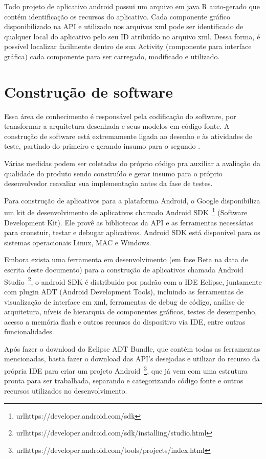 Todo projeto de aplicativo android possui um arquivo em java R auto-gerado que contém identificação os recursos do aplicativo. Cada componente gráfico disponibilizado na API e utilizado nos arquivos xml pode ser identificado de qualquer local do aplicativo pelo seu ID atribuído no arquivo xml. Dessa forma, é possível localizar facilmente dentro de sua Activity (componente para interface gráfica) cada componente para ser carregado, modificado e utilizado.

\section{Construção de software}

Essa área de conhecimento é responsável pela codificação do software, por transformar a arquitetura desenhada e seus modelos em código fonte. A construção de software está extremamente ligada ao desenho e às atividades de teste, partindo do primeiro e gerando insumo para o segundo \cite{swebok}.

Várias medidas podem ser coletadas do próprio código pra auxiliar a avaliação da qualidade do produto sendo construído e gerar insumo para o próprio desenvolvedor reavaliar sua implementação antes da fase de testes.

Para construção de aplicativos para a plataforma Android, o Google disponibiliza um kit de desenvolvimento de aplicativos chamado Android SDK~\footnote{url{https://developer.android.com/sdk}} (Software Development Kit). Ele provê as bibliotecas da API e as ferramentas necessárias para cronstuir, testar e debugar aplicativos. Android SDK está disponível para os sistemas operacionais Linux, MAC e Windows.

Embora exista uma ferramenta em desenvolvimento (em fase Beta na data de escrita deste documento) para a construção de aplicativos chamada Android Studio~\footnote{url{https://developer.android.com/sdk/installing/studio.html}}, o android SDK é distribuido por padrão com a IDE Eclipse, juntamente com plugin ADT (Android Development Tools), incluindo as ferramentas de visualização de interface em xml, ferramentas de debug de código, análise de arquitetura, níveis de hierarquia de componentes gráficos, testes de desempenho, acesso a memória flash e outros recursos do dispositivo via IDE, entre outras funcionalidades.

Após fazer o download do Eclipse ADT Bundle, que contém todas as ferramentas mencionadas, basta fazer o download das API's desejadas e utilizar do recurso da própria IDE para criar um projeto Android~\footnote{url{https://developer.android.com/tools/projects/index.html}}, que já vem com uma estrutura pronta para ser trabalhada, separando e categorizando código fonte e outros recursos utilizados no desenvolvimento.

